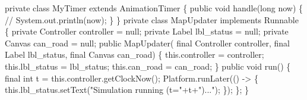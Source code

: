 \nwenddocs{}\plusendmoddef
private class MyTimer extends AnimationTimer \{
  public void handle(long now) \{
    // System.out.println(now);
  \}
\}
\nwendcode{}\nwdocspar
\nwenddocs{}\plusendmoddef
private class MapUpdater implements Runnable \{
  private Controller controller = null;
  private Label lbl_status = null;
  private Canvas can_road = null;
  public MapUpdater(
      final Controller controller,
      final Label lbl_status,
      final Canvas can_road) \{
    this.controller = controller;
    this.lbl_status = lbl_status;
    this.can_road = can_road;
  \}
  public void run() \{
    final int t = this.controller.getClockNow();
    Platform.runLater(() -> \{
      this.lbl_status.setText("Simulation running (t="+t+")...");
    \});
  \};
\}
\nwendcode{}\nwdocspar

